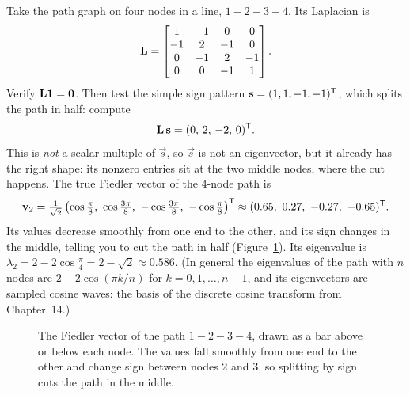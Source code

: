 \begin{labbox}
Take the path graph on four nodes in a line, $1\!-\!2\!-\!3\!-\!4$. Its Laplacian is
\[
\mathbf{L} =
\begin{bmatrix} 1&-1&0&0\\ -1&2&-1&0\\ 0&-1&2&-1\\ 0&0&-1&1 \end{bmatrix}.
\]
Verify $\mathbf{L}\mathbf{1}=\mathbf{0}$. Then test the simple sign pattern $\mathbf{s} = (1,1,-1,-1)^{\mathsf{T}}$,
which splits the path in half: compute
\[
\mathbf{L}\,\mathbf{s} = (0,\,2,\,-2,\,0)^{\mathsf{T}}.
\]
This is \emph{not} a scalar multiple of $\vec{s}$, so $\vec{s}$ is not an eigenvector, but
it already has the right shape: its nonzero entries sit at the two middle nodes, where the
cut happens. The true Fiedler vector of the $4$-node path is
\[
\mathbf{v}_2 = \tfrac{1}{\sqrt{2}}\left(\cos\tfrac{\pi}{8},\ \cos\tfrac{3\pi}{8},\
-\cos\tfrac{3\pi}{8},\ -\cos\tfrac{\pi}{8}\right)^{\mathsf{T}}
\approx (0.65,\ 0.27,\ -0.27,\ -0.65)^{\mathsf{T}} .
\]
Its values decrease smoothly from one end to the other, and its sign changes in the middle,
telling you to cut the path in half (Figure~\ref{ch35:fig-fiedler-path}). Its eigenvalue is
$\lambda_2 = 2 - 2\cos\tfrac{\pi}{4} = 2 - \sqrt2 \approx 0.586$. (In general the
eigenvalues of the path with $n$ nodes are $2 - 2\cos(\pi k/n)$ for $k = 0,1,\dots,n-1$, and
its eigenvectors are sampled cosine waves: the basis of the discrete cosine transform from
Chapter~14.)
\end{labbox}

\begin{figure}[htbp]
\centering
{}
\caption{The Fiedler vector of the path $1\!-\!2\!-\!3\!-\!4$, drawn as a bar above or below
each node. The values fall smoothly from one end to the other and change sign between nodes
$2$ and $3$, so splitting by sign cuts the path in the middle.}
\label{ch35:fig-fiedler-path}
\end{figure}

